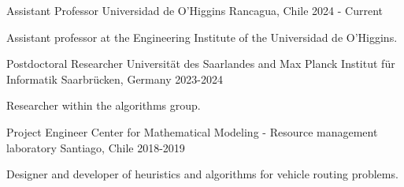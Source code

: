

\begin{cventries}

\cventry
{Assistant Professor} %
{Universidad de O'Higgins} %
{Rancagua, Chile} %
{2024  - Current} %
{
  \begin{cvitems}
    \item Assistant professor at the Engineering Institute of the Universidad de O'Higgins. 
  \end{cvitems}
}

\cventry
{Postdoctoral Researcher} %
{Universität des Saarlandes and Max Planck Institut für Informatik} %
{Saarbrücken, Germany} %
{2023-2024} %
{
  \begin{cvitems}
    \item Researcher within the algorithms group.
  \end{cvitems}
}
\cventry
    {Project Engineer} %
    {Center for Mathematical Modeling - Resource management laboratory} %
    {Santiago, Chile} %
    {2018-2019} %
    {
    \begin{cvitems}
      \item Designer and developer of heuristics and algorithms for vehicle routing problems.
    \end{cvitems}
    }
\end{cventries}
